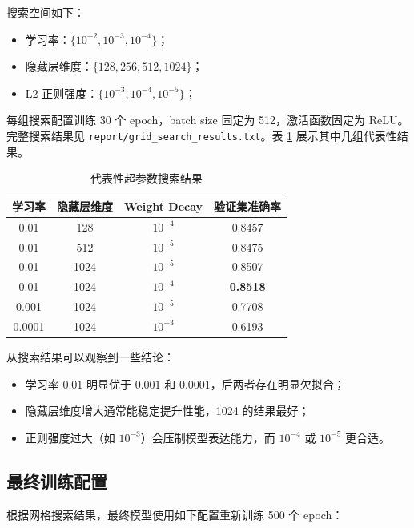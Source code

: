 \documentclass[UTF8,a4paper,12pt]{ctexart}
\begin{document}
搜索空间如下：

\begin{itemize}
    \item 学习率：$\{10^{-2}, 10^{-3}, 10^{-4}\}$；
    \item 隐藏层维度：$\{128, 256, 512, 1024\}$；
    \item L2 正则强度：$\{10^{-3}, 10^{-4}, 10^{-5}\}$；
\end{itemize}
每组搜索配置训练 30 个 epoch，batch size 固定为 512，激活函数固定为 ReLU。
完整搜索结果见 \texttt{report/grid\_search\_results.txt}。表 \ref{tab:grid} 展示其中几组代表性结果。

\begin{table}[H]
    \centering
    \caption{代表性超参数搜索结果}
    \label{tab:grid}
    \begin{tabular}{cccc}
        \toprule
        学习率 & 隐藏层维度 & Weight Decay & 验证集准确率 \\
        \midrule
        0.01   & 128  & $10^{-4}$ & 0.8457 \\
        0.01   & 512  & $10^{-5}$ & 0.8475 \\
        0.01   & 1024 & $10^{-5}$ & 0.8507 \\
        0.01   & 1024 & $10^{-4}$ & \textbf{0.8518} \\
        0.001  & 1024 & $10^{-5}$ & 0.7708 \\
        0.0001 & 1024 & $10^{-3}$ & 0.6193 \\
        \bottomrule
    \end{tabular}
\end{table}

从搜索结果可以观察到一些结论：

\begin{itemize}
    \item 学习率 $0.01$ 明显优于 $0.001$ 和 $0.0001$，后两者存在明显欠拟合；
    \item 隐藏层维度增大通常能稳定提升性能，1024 的结果最好；
    \item 正则强度过大（如 $10^{-3}$）会压制模型表达能力，而 $10^{-4}$ 或 $10^{-5}$ 更合适。
\end{itemize}

\subsection{最终训练配置}

根据网格搜索结果，最终模型使用如下配置重新训练 500 个 epoch：
\end{document}
